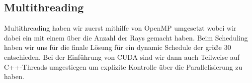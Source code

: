 \subsection{Multithreading}
Multithreading haben wir zuerst mithilfe von OpenMP umgesetzt wobei wir dabei ein  mit einem  über die Anzahl der Rays gemacht haben.
Beim Scheduling haben wir uns für die finale Lösung für ein dynamic Schedule der größe 30 entschieden.
Bei der Einführung von CUDA sind wir dann auch Teilweise auf C++-Threads umgestiegen um explizite Kontrolle über die Parallelisierung zu haben.

